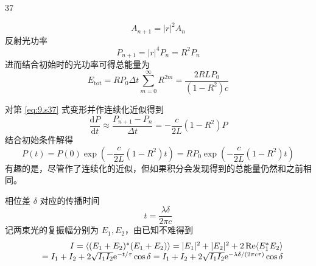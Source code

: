 \begin{solution}{37}
\begin{subsolution}
\begin{subsubsolution}
\begin{equation}
                A _ {n + 1} = | r | ^ {2} A _ {n}
                \label{eq:8.s37}
            \end{equation}
            反射光功率
            \begin{equation}
                P _ {n + 1} = \left| r \right| ^ {4} P _ {n} = R ^ {2} P _ {n}
                \label{eq:9.s37}
            \end{equation}
            进而结合初始时的光功率可得总能量为
            \begin{equation}
                E _ {\mathrm{tot}} = R P _ {0} \Delta t \sum_ {m = 0} ^ {\infty} R ^ {2 m} = \frac {2 R L P _ {0}}{(1 - R ^ {2}) c}
                \label{eq:10.s37}
            \end{equation}
        \end{subsubsolution}
        \begin{subsubsolution}
            对第 \eqref{eq:9.s37} 式变形并作连续化近似得到
            \begin{equation}
                \frac {\mathrm{d} P}{\mathrm{d} t} \approx \frac {P _ {n + 1} - P _ {n}}{\Delta t} = - \frac {c}{2 L} (1 - R ^ {2}) P
                \label{eq:11.s37}
            \end{equation}
            结合初始条件解得
            \begin{equation}
                P (t) = P (0) \exp \left(- \frac {c}{2 L} (1 - R ^ {2}) t\right) = R P _ {0} \exp \left(- \frac {c}{2 L} (1 - R ^ {2}) t\right)
                \label{eq:12.s37}
            \end{equation}
            有趣的是，尽管作了连续化的近似，但如果积分会发现得到的总能量仍然和之前相同。
        \end{subsubsolution}
    \end{subsolution}
    \begin{subsolution}
        \begin{subsubsolution}
            相位差 $\delta$ 对应的传播时间
            \begin{equation}
                t = \frac {\lambda \delta}{2 \pi c}
                \label{eq:13.s37}
            \end{equation}
            记两束光的复振幅分别为 $E_{1}, E_{2}$，由已知不难得到
            \begin{equation}
                \begin{array}{r l} I = \langle (E _ {1} + E _ {2}) ^ {*} (E _ {1} + E _ {2}) \rangle = | E _ {1} | ^ {2} + | E _ {2} | ^ {2} + 2 \operatorname{Re} \langle E _ {1} ^ {*} E _ {2} \rangle \\ \quad = I _ {1} + I _ {2} + 2 \sqrt {I _ {1} I _ {2}} \mathrm{e} ^ {- t / \tau} \cos \delta = I _ {1} + I _ {2} + 2 \sqrt {I _ {1} I _ {2}} \mathrm{e} ^ {- \lambda \delta / (2 \pi c \tau)} \cos \delta \end{array}

\end{equation}
\end{subsubsolution}
\end{subsolution}
\end{solution}

